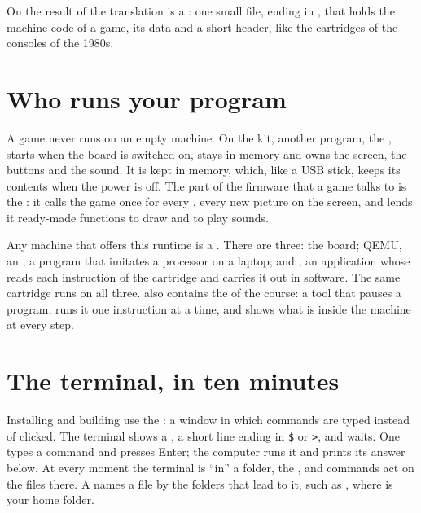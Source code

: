 \noindent On \prg the result of the translation is a : one
small file, ending in , that holds the machine code of a game, its
data and a short header, like the cartridges of the consoles of the 1980s.

\section*{Who runs your program}

A game never runs on an empty machine. On the \prg kit, another program, the
, starts when the board is switched on, stays in memory and owns
the screen, the buttons and the sound. It is kept in  memory, which,
like a USB stick, keeps its contents when the power is off. The part of the
firmware that a game talks to is the : it calls the game once for
every , every new picture on the screen, and lends it ready-made
functions to draw and to play sounds.

Any machine that offers this runtime is a . There are three: the
board; QEMU, an , a program that imitates a processor on a
laptop; and \prgqt, an application whose  reads each
instruction of the cartridge and carries it out in software. The same
cartridge runs on all three. \prgqt also contains the  of the
course: a tool that pauses a program, runs it one instruction at a time, and
shows what is inside the machine at every step.

\section*{The terminal, in ten minutes}

Installing and building use the : a window in which commands are
typed instead of clicked. The terminal shows a , a short line
ending in \texttt{\$} or \texttt{>}, and waits. One types a command and presses
Enter; the computer runs it and prints its answer below. At every moment the
terminal is ``in'' a folder, the , and commands act on
the files there. A  names a file by the folders that lead to it,
such as \allowbreak{}, where
\fname{\textasciitilde} is your home folder.

